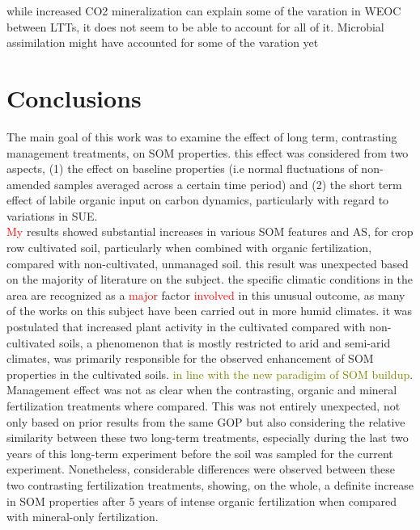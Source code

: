 \documentclass[12pt]{report}
\newcommand{\myRed}[1]{\textcolor{red}{#1}} %
\newcommand{\myGreen}[1]{\textcolor{olive}{#1}} %
\begin{document}
		while increased CO2 mineralization can explain some of the varation in WEOC between LTTs, it does not seem to be able to account for all of it. Microbial assimilation might have accounted for some of the varation yet 
				
		
						
			
			
			
				
				
				
				
				

	
	\chapter{Conclusions}
		
The  main goal of this work was to examine the effect of long term, contrasting management treatments, on SOM properties. this effect was considered from two aspects, (1) the effect on baseline properties (i.e normal fluctuations of non-amended samples averaged across a certain time period) and (2) the short term effect of  labile organic input on carbon dynamics, particularly with regard to variations in SUE.\\
\myRed{My} results showed substantial increases in various SOM features and AS, for crop row cultivated soil, particularly when combined with organic fertilization, compared with non-cultivated, unmanaged soil. this result was unexpected based on the majority of literature on the subject. the specific climatic conditions in the area are recognized as a \myRed{major} factor \myRed{involved} in this unusual outcome, as many of the works on this subject have been carried out in more humid climates. it was postulated that increased plant activity in the cultivated compared with non-cultivated soils, a phenomenon that is mostly restricted to arid and semi-arid climates, was primarily responsible for the observed enhancement of SOM properties in the cultivated soils. \myGreen{in line with the new paradigim of SOM buildup}. \\
Management effect was not as clear when the contrasting, organic and mineral fertilization treatments where compared. This was not entirely unexpected, not only based on prior results from the same GOP but also considering the relative similarity between these two long-term treatments, especially during the last two years of this long-term experiment before the soil was sampled for the current experiment. Nonetheless, considerable differences were observed between these two contrasting fertilization treatments, showing, on the whole, a definite increase in SOM properties after 5 years of intense organic fertilization when compared with mineral-only fertilization.\\
\end{document}
